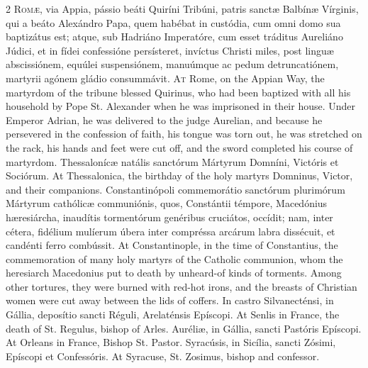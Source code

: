 \begin{paracol}{2}
\lettrine[lines=2]{R}{omæ,} via Appia, pássio beáti Quiríni Tribúni, 
 patris sanctæ Balbínæ Vírginis, qui a beáto Alexándro Papa, quem habébat in 
 custódia, cum omni domo sua baptizátus est; atque, sub Hadriáno Imperatóre, 
 cum esset tráditus Aureliáno Júdici, et in fídei confessióne persísteret, 
 invíctus Christi miles, post linguæ abscissiónem, equúlei suspensiónem, 
 manuúmque ac pedum detruncatiónem, martyrii agónem gládio consummávit.
\switchcolumn
{}
\lettrine[lines=2]{A}{t} Rome, on the Appian Way, the martyrdom of the tribune blessed Quirinus, 
 who had been baptized with all his household by Pope St. Alexander when he 
 was imprisoned in their house. Under Emperor Adrian, he was delivered 
 to the judge Aurelian, and because he persevered in the confession of faith, 
 his tongue was torn out, he was stretched on the rack, his hands and feet 
 were cut off, and the sword completed his course of martyrdom.
\switchcolumn*
{}
Thessalonícæ 
 natális sanctórum Mártyrum Domníni, Victóris et Sociórum.
\switchcolumn
{}
At Thessalonica, the birthday of the holy martyrs Domninus, Victor, and 
 their companions.
\switchcolumn*
{}
Constantinópoli commemorátio sanctórum plurimórum Mártyrum cathólicæ 
 communiónis, quos, Constántii témpore, Macedónius hæresiárcha, inaudítis 
 tormentórum genéribus cruciátos, occídit; nam, inter cétera, fidélium 
 mulíerum úbera inter compréssa arcárum labra dissécuit, et candénti ferro 
 combússit.
\switchcolumn
{}
At Constantinople, in the time of Constantius, the commemoration of many 
 holy martyrs of the Catholic communion, whom the heresiarch Macedonius put 
 to death by unheard-of kinds of torments. Among other tortures, they 
 were burned with red-hot irons, and the breasts of Christian women were cut 
 away between the lids of coffers.
\switchcolumn*
{}
In castro Silvanecténsi, in Gállia, deposítio sancti Réguli, Arelaténsis 
 Epíscopi.
\switchcolumn
{}
At Senlis in France, the death of St. Regulus, bishop of Arles.
\switchcolumn*
{}
Auréliæ, in Gállia, sancti Pastóris Epíscopi.
\switchcolumn
{}
At Orleans in France, Bishop St. Pastor.
\switchcolumn*
{}
Syracúsis, in Sicília, sancti Zósimi, 
 Epíscopi et Confessóris.
\switchcolumn
{}
At Syracuse, St. Zosimus, bishop and confessor.
\switchcolumn*
{}

\end{paracol}
